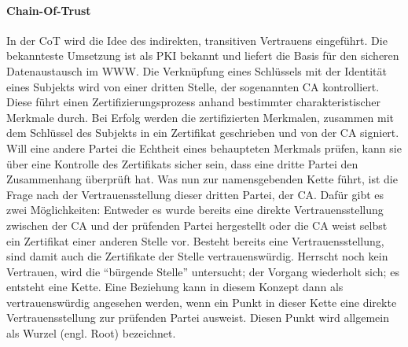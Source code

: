 \paragraph{Chain-Of-Trust}
In der \ac{CoT} wird die Idee des indirekten, transitiven Vertrauens eingeführt. Die bekannteste Umsetzung ist als \ac{PKI} bekannt und liefert die Basis für den sicheren Datenaustausch im \ac{WWW}. Die Verknüpfung eines Schlüssels mit der Identität eines Subjekts wird von einer dritten Stelle, der sogenannten \ac{CA} kontrolliert. Diese führt einen Zertifizierungsprozess  anhand bestimmter charakteristischer Merkmale durch. Bei Erfolg werden die zertifizierten Merkmalen, zusammen mit dem Schlüssel des Subjekts in ein Zertifikat geschrieben und von der \ac{CA} signiert. Will eine andere Partei die Echtheit eines behaupteten Merkmals prüfen, kann sie über eine Kontrolle des Zertifikats sicher sein, dass eine dritte Partei den Zusammenhang überprüft hat. Was nun zur namensgebenden Kette führt, ist die Frage nach der Vertrauensstellung dieser dritten Partei, der \ac{CA}. Dafür gibt es zwei Möglichkeiten: Entweder es wurde bereits eine direkte Vertrauensstellung zwischen der \ac{CA} und der prüfenden Partei hergestellt oder die \ac{CA} weist selbst ein Zertifikat einer anderen Stelle vor. Besteht bereits eine Vertrauensstellung, sind damit auch die Zertifikate der Stelle vertrauenswürdig. Herrscht noch kein Vertrauen, wird die ``bürgende Stelle'' untersucht; der Vorgang wiederholt sich; es entsteht eine Kette. Eine Beziehung kann in diesem Konzept dann als vertrauenswürdig angesehen werden, wenn ein Punkt in dieser Kette eine direkte Vertrauensstellung zur prüfenden Partei ausweist. Diesen Punkt wird allgemein als Wurzel (engl. Root) bezeichnet\cite[p. 423 ff.]{Eckert2013}.  
